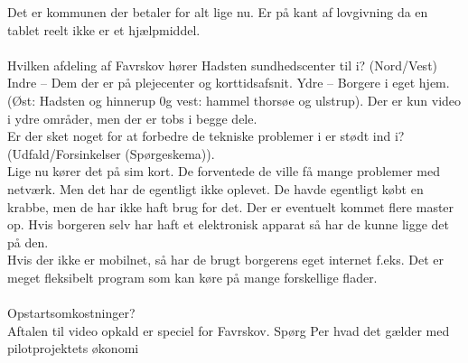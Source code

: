 Det er kommunen der betaler for alt lige nu. Er på kant af lovgivning da en tablet reelt ikke er et hjælpmiddel. \\\\
Hvilken afdeling af Favrskov hører Hadsten sundhedscenter til i? (Nord/Vest)\\
Indre – Dem der er på plejecenter og korttidsafsnit. 
Ydre – Borgere i eget hjem. (Øst: Hadsten og hinnerup 0g vest: hammel thorsøe og ulstrup). 
Der er kun video i ydre områder, men der er tobs i begge dele. \\
Er der sket noget for at forbedre de tekniske problemer i er stødt ind i? (Udfald/Forsinkelser (Spørgeskema)).\\ 
Lige nu kører det på sim kort. De forventede de ville få mange problemer med netværk. Men det har de egentligt ikke oplevet. De havde egentligt købt en krabbe, men de har ikke haft brug for det. Der er eventuelt kommet flere master op. Hvis borgeren selv har haft et elektronisk apparat så har de kunne ligge det på den. \\
Hvis der ikke er mobilnet, så har de brugt borgerens eget internet f.eks. Det er meget fleksibelt program som kan køre på mange forskellige flader. \\\\
Opstartsomkostninger?\\
Aftalen til video opkald er speciel for Favrskov. Spørg Per hvad det gælder med pilotprojektets økonomi

